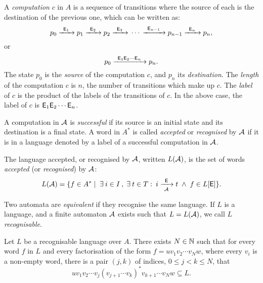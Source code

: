 A \emph{computation} $c$ in $A$ is a sequence of transitions where the source of each is the destination of the previous one, which can be written as:
\[
    p_0 {\; \xrightarrow[]{\: \; {\mathsf{E}}_1 \: \;} \;} p_1 {\; \xrightarrow[]{\: \; {\mathsf{E}}_2 \: \;} \;} p_2 {\; \xrightarrow[]{\: \; {\mathsf{E}}_3 \: \;} \;} \dotsm {\; \xrightarrow[]{\: \; {\mathsf{E}}_{n-1} \: \;} \;} p_{n-1} {\; \xrightarrow[]{\: \; {\mathsf{E}}_n \: \;} \;} p_n,
\]
or
\[
    p_0 {\; \xrightarrow[]{\: \; {\mathsf{E}}_1 {\mathsf{E}}_2 \dotsm {\mathsf{E}}_n \: \;} \;} p_n.
\]
The state $p_0$ is the \emph{source} of the computation $c$, and $p_n$ its \emph{destination}. The \emph{length} of the computation $c$ is $n$, the number of transitions which make up $c$. The \emph{label} of $c$ is the product of the labels of the transitions of $c$. In the above case, the label of $c$ is ${\mathsf{E}}_1 {\mathsf{E}}_2 \dotsm {\mathsf{E}}_n$.

A computation in ${\mathcal{A}}$ is \emph{successful} if its source is an initial state and its destination is a final state. A word in $A^*$ is called \emph{accepted} or \emph{recognised} by ${\mathcal{A}}$ if it is in a language denoted by a label of a successful computation in ${\mathcal{A}}$.

\begin{defn}
    The language accepted, or recognised by ${\mathcal{A}}$, written $L({\mathcal{A}})$, is the set of words \emph{accepted} (or \emph{recognised}) by ${\mathcal{A}}$:
    \[
        L({\mathcal{A}}) = \{ f \in A^* \mid \; \exists \: i \in I \: , \; \exists \: t \in T : \: i {\; \xrightarrow[{\mathcal{A}}]{\: \; {\mathsf{E}} \: \;} \;} t \; \wedge \; f \in L[{\mathsf{E}}] \}.
    \]
\end{defn}

Two automata are \emph{equivalent} if they recognise the same language. If $L$ is a language, and a finite automaton ${\mathcal{A}}$ exists such that $L = L({\mathcal{A}})$, we call $L$ \emph{recognisable}.

\begin{lemma}\label{lm:block_star_lemma}
    Let $L$ be a recognisable language over $A$. There exists $N \in \mathbb{N}$ such that for every word $f$ in $L$ and every factorisation of the form $f = u v_1 v_2 \dotsm v_N w$, where every $v_i$ is a non-empty word, there is a pair $(j,k)$ of indices, $0 \leq j < k \leq N$, that
    \[
        u v_1 v_2 \dotsm v_j {(v_{j+1} \dotsm v_k)}^* v_{k+1} \dotsm v_N w \subseteq L.
    \]
\end{lemma}

